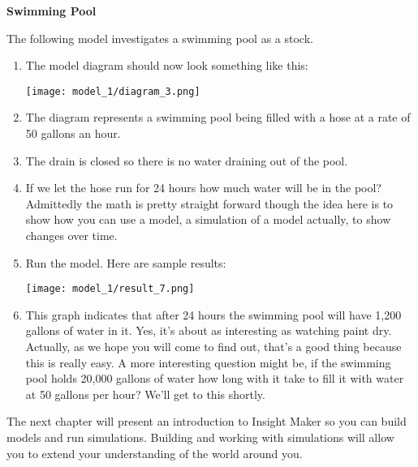\documentclass[]{memoir}
\makeatletter
\def\maxwidth{\ifdim\Gin@nat@width>\linewidth\linewidth
\else\Gin@nat@width\fi}
\let\Oldincludegraphics\includegraphics
\renewcommand{\includegraphics}[1]{\Oldincludegraphics[width=\maxwidth]{#1}}
\makeatother
\begin{document}
\begin{oframed}\textbf{Swimming Pool} 

 The following model investigates a swimming pool as a stock.

\begin{enumerate}
\item The model diagram should now look something like this: \par \begin{minipage}{\linewidth}  \centering \texttt{[image: model\_1/diagram\_3.png]}
\end{minipage}
\item 

The diagram represents a swimming pool being filled with a hose at a rate of 50 gallons an hour.


\item 

The drain is closed so there is no water draining out of the pool.


\item 

If we let the hose run for 24 hours how much water will be in the pool? Admittedly the math is pretty straight forward though the idea here is to show how you can use a model, a simulation of a model actually, to show changes over time.


\item Run the model. Here are sample results:\par \begin{minipage}{\linewidth}  \centering \texttt{[image: model\_1/result\_7.png]}
\end{minipage}
\item 

This graph indicates that after 24 hours the swimming pool will have 1,200 gallons of water in it. Yes, it's about as interesting as watching paint dry. Actually, as we hope you will come to find out, that's a good thing because this is really easy. A more interesting question might be, if the swimming pool holds 20,000 gallons of water how long with it take to fill it with water at 50 gallons per hour? We'll get to this shortly.



\end{enumerate} \end{oframed}

The next chapter will present an introduction to Insight Maker so you
can build models and run simulations. Building and working with
simulations will allow you to extend your understanding of the world
around you.
\end{document}
